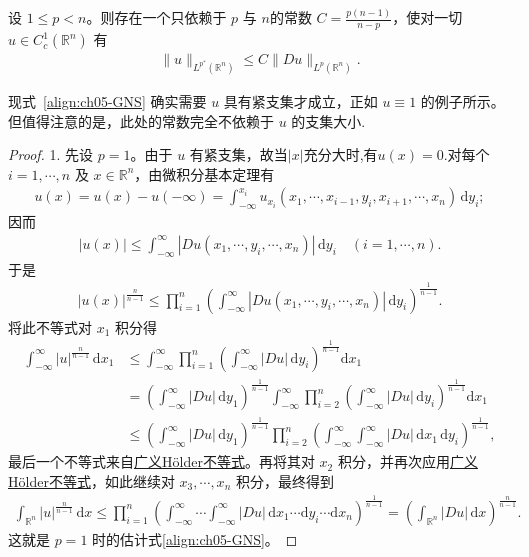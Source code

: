 \documentclass[../../main.tex]{subfiles}
\begin{document}
\begin{theorem}\label{theorem:Gagliardo--Nirenberg--Sobolev不等式}
设 $1\leqslant p<n$。则存在一个只依赖于 $p$ 与 $n$的常数 $C=\frac{p(n-1)}{n-p}$，使对一切 $u\in C^{1}_{c}(\mathbb{R}^{n})$ 有
\begin{align}
\|u\|_{L^{p^{*}}(\mathbb{R}^{n})}\leqslant C\|Du\|_{L^{p}(\mathbb{R}^{n})}.
\label{align:ch05-GNS}
\end{align}
\end{theorem}
\begin{remark}
现式~\eqref{align:ch05-GNS} 确实需要 $u$ 具有紧支集才成立，正如 $u\equiv 1$ 的例子所示。但值得注意的是，此处的常数完全不依赖于 $u$ 的支集大小.
\end{remark}
\begin{proof}

1. 先设 $p=1$。由于 $u$ 有紧支集，故当$|x|$充分大时,有$u(x)=0$.对每个 $i=1,\cdots,n$ 及 $x\in\mathbb{R}^{n}$，由微积分基本定理有
\begin{align*}
u(x)=u(x)-u(-\infty)=\int_{-\infty}^{x_{i}}u_{x_{i}}(x_{1},\cdots,x_{i-1},y_{i},x_{i+1},\cdots,x_{n})\,\mathrm{d}y_{i};
\end{align*}
因而
\begin{align*}
|u(x)|\leqslant\int_{-\infty}^{\infty}|Du(x_{1},\cdots,y_{i},\cdots,x_{n})|\,\mathrm{d}y_{i}\quad (i=1,\cdots,n).
\end{align*}
于是
\begin{align*}
|u(x)|^{\frac{n}{n-1}}
\leqslant\prod_{i=1}^{n}\left(\int_{-\infty}^{\infty}|Du(x_{1},\cdots,y_{i},\cdots,x_{n})|\,\mathrm{d}y_{i}\right)^{\frac{1}{n-1}}.
\end{align*}
将此不等式对 $x_{1}$ 积分得
\begin{align*}
\int_{-\infty}^{\infty}|u|^{\frac{n}{n-1}}\,\mathrm{d}x_{1}
&\leqslant\int_{-\infty}^{\infty}\prod_{i=1}^{n}\left(\int_{-\infty}^{\infty}|Du|\,\mathrm{d}y_{i}\right)^{\frac{1}{n-1}}\mathrm{d}x_{1}\\
&=\left(\int_{-\infty}^{\infty}|Du|\,\mathrm{d}y_{1}\right)^{\frac{1}{n-1}}
\int_{-\infty}^{\infty}\prod_{i=2}^{n}\left(\int_{-\infty}^{\infty}|Du|\,\mathrm{d}y_{i}\right)^{\frac{1}{n-1}}\mathrm{d}x_{1}\\
&\leqslant\left(\int_{-\infty}^{\infty}|Du|\,\mathrm{d}y_{1}\right)^{\frac{1}{n-1}}
\prod_{i=2}^{n}\left(\int_{-\infty}^{\infty}\int_{-\infty}^{\infty}|Du|\,\mathrm{d}x_{1}\,\mathrm{d}y_{i}\right)^{\frac{1}{n-1}},
\end{align*}
最后一个不等式来自\hyperref[theorem:广义Holder不等式]{广义Hölder不等式}。再将其对 $x_{2}$ 积分，并再次应用\hyperref[theorem:广义Holder不等式]{广义Hölder不等式}，如此继续对 $x_{3},\cdots,x_{n}$ 积分，最终得到
\begin{align}
\int_{\mathbb{R}^{n}}|u|^{\frac{n}{n-1}}\,\mathrm{d}x
\leqslant\prod_{i=1}^{n}\left(\int_{-\infty}^{\infty}\cdots\int_{-\infty}^{\infty}|Du|\,\mathrm{d}x_{1}\cdots\mathrm{d}y_{i}\cdots\mathrm{d}x_{n}\right)^{\frac{1}{n-1}}
=\left(\int_{\mathbb{R}^{n}}|Du|\,\mathrm{d}x\right)^{\frac{n}{n-1}}.\label{eq:JIFOJEIOJIOF32423rIDFJ}
\end{align}
这就是 $p=1$ 时的估计式\eqref{align:ch05-GNS}。


\end{proof}
\end{document}
